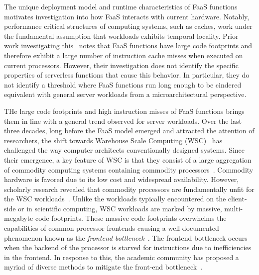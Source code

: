 \documentclass[../main.tex]{subfiles}
\begin{document}
\begin{refsection}
The unique deployment model and runtime characteristics of FaaS
functions motivates investigation into how FaaS interacts with current
hardware. Notably, performance critical structures of computing
systems, such as caches, work under the fundamental assumption that
workloads exhibits temporal locality. Prior work investigating
this~\cite{lukewarm_serverless} notes that FaaS functions have large
code footprints and therefore exhibit a large number of instruction
cache misses when executed on current processors. However, their
investigation does not identify the specific properties of serverless
functions that cause this behavior. In particular, they do not
identify a threshold where FaaS functions run long enough to be
cindered equivalent with general server workloads from a
microarchitectural perspective.

THe large code footprints and high instruction misses of FaaS
functions brings them in line with a general trend observed for server
workloads. Over the last three decades, long before the FaaS model
emerged and attracted the attention of researchers, the shift towards
Warehouse Scale Computing (WSC)~\cite{barroso18_datac_as_comput} has
challenged the way computer architects conventionally designed
systems. Since their emergence, a key feature of WSC is that they
consist of a large aggregation of commodity computing systems
containing commodity
processors~\cite{barroso03_web_searc_planet}. Commodity hardware is
favored due to its low cost and widespread availability. However,
scholarly research revealed that commodity processors are
fundamentally unfit for the WSC
workloads~\cite{ferdman12_clear_cloud,kanev15_profil}. Unlike the
workloads typically encountered on the client-side or in scientific
computing, WSC workloads are marked by massive, multi-megabyte code
footprints. These massive code footprints overwhelms the capabilities
of common processor frontends causing a well-documented phenomenon
known as the \emph{frontend
  bottleneck}~\cite{ailamaki99_dbmss_moder_proces,keeton98_perfor_charac_quad_pentium_pro,ranganathan98_perfor_datab_workl_shared_memor}. The
frontend bottleneck occurs when the backend of the processor is
starved for instructions due to inefficiencies in the frontend. In
response to this, the academic community has proposed a myriad of
diverse methods to mitigate the front-end
bottleneck~\cite{reinman99_fetch_direc_instr_prefet,kumar17_boomer,kumar18_blast_throug_front_end_bottl_with_shotg,kumar20_shoot_down_server_front_end_bottl,ferdman08_tempor,ferdman11_proac_instr_fetch,kaynak13_shift,kaynak15_confl,ayers19_asmdb,ajorpaz18_explor_predic_replac_polic_instr,khan20_i_spy,soundararajan21_pdede,ansari20_divid,khan21_rippl,}.




\end{refsection}
\end{document}

